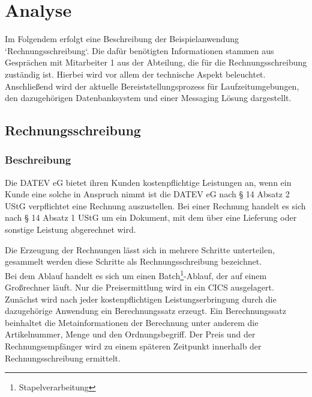 \chapter{Analyse}\label{ch:analyse}
Im Folgendem erfolgt eine Beschreibung der Beispielanwendung `Rechnungsschreibung`.
Die dafür benötigten Informationen stammen aus Gesprächen mit Mitarbeiter 1 aus der Abteilung, die für die Rechnungsschreibung zuständig ist.
Hierbei wird vor allem der technische Aspekt beleuchtet.
Anschließend wird der aktuelle Bereiststellungsprozess für Laufzeitumgebungen, den dazugehörigen Datenbanksystem und einer Messaging Lösung dargestellt.

\section{Rechnungsschreibung}

\subsection{Beschreibung}\label{rechBesch}
Die DATEV eG bietet ihren Kunden kostenpflichtige Leistungen an, wenn ein Kunde eine solche in Anspruch nimmt ist die DATEV eG nach § 14 Absatz 2 UStG verpflichtet eine Rechnung auszustellen.
Bei einer Rechnung handelt es sich nach § 14 Absatz 1 UStG um ein Dokument, mit dem über eine Lieferung oder sonstige Leistung abgerechnet wird.

Die Erzeugung der Rechnungen lässt sich in mehrere Schritte unterteilen, gesammelt werden diese Schritte als Rechnungsschreibung bezeichnet.\\
Bei dem Ablauf handelt es sich um einen Batch\footnote{Stapelverarbeitung}-Ablauf, der auf einem Großrechner läuft.
Nur die Preisermittlung wird in ein CICS ausgelagert.
Zunächst wird nach jeder kostenpflichtigen Leistungserbringung durch die dazugehörige Anwendung ein Berechnungssatz erzeugt.
Ein Berechnungssatz beinhaltet die Metainformationen der Berechnung unter anderem die Artikelnummer, Menge und den Ordnungsbegriff.
Der Preis und der Rechnungsempfänger wird zu einem späteren Zeitpunkt innerhalb der Rechnungsschreibung ermittelt.

